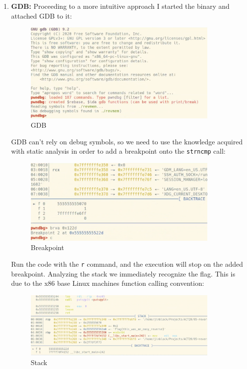 \documentclass{article}
\begin{document}
\begin{enumerate}
\item{\textbf{GDB:}}
\noindent\linebreak
Proceeding to a more intuitive approach I started the binary and attached GDB to it:
\begin{figure}[H]
\centering
\includegraphics[width=0.9\textwidth]{img/gdb_1.jpg}
\caption{GDB}
\label{fig:gdb_1}
\end{figure}

\noindent\linebreak
GDB can't rely on debug symbols, so we need to use the knowledge acquired with static analysis in order to
add a breakpoint onto the \texttt{strncmp} call:
\begin{figure}[H]
\centering
\includegraphics[width=0.9\textwidth]{img/gdb_2.jpg}
\caption{Breakpoint}
\label{fig:gdb_2}
\end{figure}

\noindent\linebreak
Run the code with the \texttt{r} command, and the execution will stop on the added breakpoint. Analyzing the
stack we immediately recognize the flag. This is due to the x86 base Linux machines function calling convention:
\begin{figure}[H]
\centering
\includegraphics[width=0.9\textwidth]{img/gdb_3.jpg}
\caption{Stack}
\label{fig:gdb_3}
\end{figure}


\end{enumerate}
\end{document}
